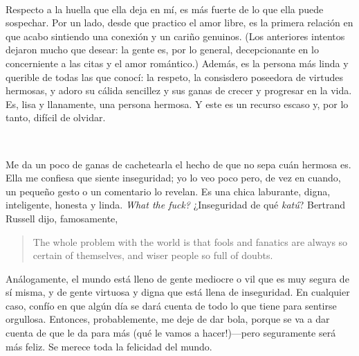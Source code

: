 \documentclass[a4paper, 12pt]{article}
\begin{document}
~ 

Respecto a la huella que ella deja en mí, es más fuerte de lo que ella puede
sospechar. Por un lado, desde que practico el amor libre, es la primera
relación en que acabo sintiendo una conexión y un cariño genuinos. (Los
anteriores intentos dejaron mucho que desear: la gente es, por lo general,
decepcionante en lo concerniente a las citas y el amor romántico.) Además, es
la persona más linda y querible de todas las que conocí: la respeto, la
consisdero poseedora de virtudes hermosas, y adoro su cálida sencillez y sus
ganas de crecer y progresar en la vida. Es, lisa y llanamente, una persona 
hermosa. Y este es un recurso escaso y, por lo tanto, difícil de olvidar.

~ 

Me da un poco de ganas de cachetearla el hecho de que no sepa cuán hermosa es.
Ella me confiesa que siente inseguridad; yo lo veo poco pero, de vez en cuando,
un pequeño gesto o un comentario lo revelan. Es una chica laburante, digna, 
inteligente, honesta y linda. \textit{What the fuck?} ¿Inseguridad de qué \textit{katú}?
Bertrand Russell dijo, famosamente,

\begin{quote}
    The whole problem with the world is that fools and fanatics are always so certain of themselves, and wiser people so full of doubts.
\end{quote}

Análogamente, el mundo está lleno de gente mediocre o vil que es muy segura de
sí misma, y de gente virtuosa y digna que está llena de inseguridad. En
cualquier caso, confío en que algún día se dará cuenta de todo lo que tiene
para sentirse orgullosa. Entonces, probablemente, me deje de dar bola, porque
se va a dar cuenta de que le da para más (qué le vamos a hacer!)---pero
seguramente será más feliz. Se merece toda la felicidad del mundo.
\end{document}
